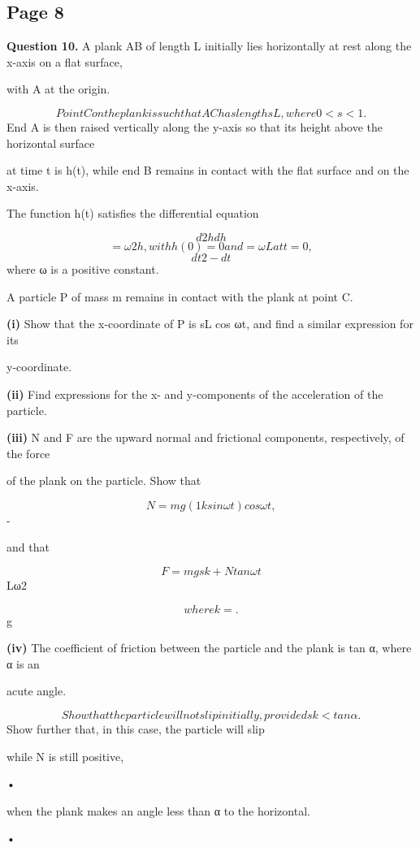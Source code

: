 \documentclass[12pt]{article}
\begin{document}
\subsection*{Page 8}
\begin{flushleft}
\bigskip\textbf{Question 10.} A plank AB of length L initially lies horizontally at rest along the x-axis on a flat surface,\par
with A at the origin.\par
\[Point C on the plank is such that AC has length sL, where 0 < s < 1.\]
End A is then raised vertically along the y-axis so that its height above the horizontal surface\par
at time t is h(t), while end B remains in contact with the flat surface and on the x-axis.\par
The function h(t) satisfies the differential equation\par
\[d2h dh\]
\[= ω2h, with h(0) = 0 and = ωL at t = 0,\]
\[dt2 - dt\]
where ω is a positive constant.\par
A particle P of mass m remains in contact with the plank at point C.\par
\textbf{(i)} Show that the x-coordinate of P is sL cos ωt, and find a similar expression for its\par
y-coordinate.\par
\textbf{(ii)} Find expressions for the x- and y-components of the acceleration of the particle.\par
\textbf{(iii)} N and F are the upward normal and frictional components, respectively, of the force\par
of the plank on the particle. Show that\par
\[N = mg(1 k sin ωt) cos ωt,\]
-\par
and that\par
\[F = mgsk + N tan ωt\]
Lω2\par
\[where k = .\]
g\par
\textbf{(iv)} The coefficient of friction between the particle and the plank is tan α, where α is an\par
acute angle.\par
\[Show that the particle will not slip initially, provided sk < tan α.\]
Show further that, in this case, the particle will slip\par
while N is still positive,\par
•\par
when the plank makes an angle less than α to the horizontal.\par
•\par
\end{flushleft}
\end{document}
